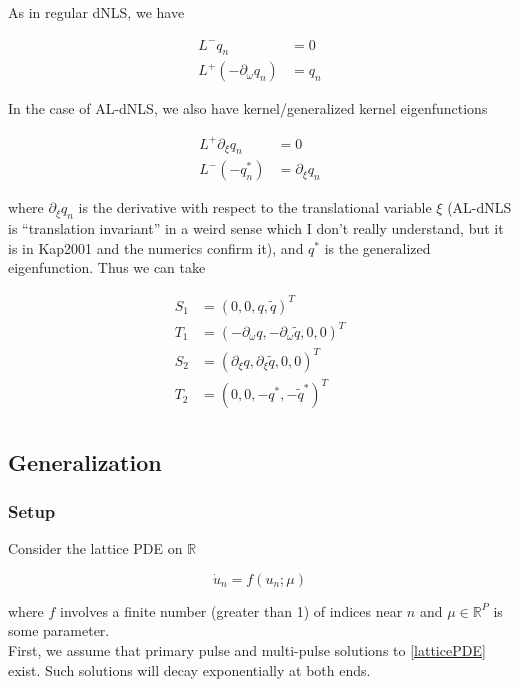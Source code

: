 \documentclass[12pt]{article}
\def\R{{\mathbb R}}
\begin{document}
As in regular dNLS, we have

\begin{align*}
L^- q_n &= 0 \\
L^+(-\partial_\omega q_n) &= q_n 
\end{align*}

In the case of AL-dNLS, we also have kernel/generalized kernel eigenfunctions

\begin{align*}
L^+ \partial_\xi q_n &= 0 \\
L^- (-q^*_n) &= \partial_\xi q_n
\end{align*}

where $\partial_\xi q_n$ is the derivative with respect to the translational variable $\xi$ (AL-dNLS is ``translation invariant'' in a weird sense which I don't really understand, but it is in Kap2001 and the numerics confirm it), and $q^*$ is the generalized eigenfunction. Thus we can take

\begin{align*}
S_1 &= (0, 0, q, \tilde{q})^T \\
T_1 &= (-\partial_\omega q, -\partial_\omega \tilde{q}, 0, 0)^T \\
S_2 &= (\partial_\xi q, \partial_\xi \tilde{q}, 0, 0)^T \\
T_2 &= (0, 0, -q^*, -\tilde{q}^*)^T \\
\end{align*}

\subsection{Generalization}

\subsubsection{Setup}

Consider the lattice PDE on $\R$

\begin{equation}\label{latticePDE}
\dot{u}_n = f(u_n; \mu)
\end{equation}

where $f$ involves a finite number (greater than 1) of indices near $n$ and $\mu \in \R^P$ is some parameter.\\

First, we assume that primary pulse and multi-pulse solutions to \eqref{latticePDE} exist. Such solutions will decay exponentially at both ends.
\end{document}
